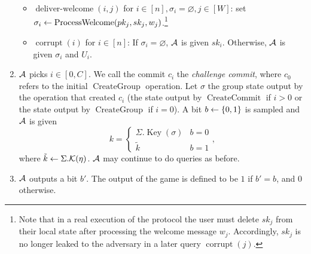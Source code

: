 \begin{definition}
\begin{enumerate}[1.]
\begin{itemize}
			      \item $\operatorname{deliver-welcome}(i, j)$ for $i \in [n], \sigma_i = \varnothing, j \in [W]$: set $\sigma_i \leftarrow \operatorname{ProcessWelcome}(pk_j, sk_j, w_j)$.\footnote{Note that in a real execution of the protocol the user must delete $sk_j$ from their local state after processing the welcome message $w_j$. Accordingly, $sk_j$ is no longer leaked to the adversary in a later query $\operatorname{corrupt}(j)$.}
			      \item $\operatorname{corrupt}(i)$ for $i \in [n]$: If $\sigma_i = \varnothing$, $\mathcal{A}$ is given $sk_i$. Otherwise, $\mathcal{A}$ is given $\sigma_i$ and $U_i$.
		      \end{itemize}
		\item $\mathcal{A}$ picks $i \in [0, C]$. We call the commit $c_i$ the \emph{challenge commit}, where $c_0$ refers to the initial $\operatorname{CreateGroup}$ operation. Let $\sigma$ the group state output by the operation that created $c_i$ (the state output by $\operatorname{CreateCommit}$ if $i > 0$ or the state output by $\operatorname{CreateGroup}$ if $i = 0$). A bit $b \leftarrow \{0, 1\}$ is sampled and $\mathcal{A}$ is given
		      \[
			      k = \begin{cases}
				      \Sigma.\operatorname{Key}(\sigma) & b = 0 \\
				      \tilde{k}                         & b = 1
			      \end{cases},
		      \]
		      where $\tilde{k} \leftarrow \Sigma.\mathcal{K}(\eta)$. $\mathcal{A}$ may continue to do queries as before.
		\item $\mathcal{A}$ outputs a bit $b'$. The output of the game is defined to be $1$ if $b' = b$, and $0$ otherwise.
	\end{enumerate}


\end{definition}
